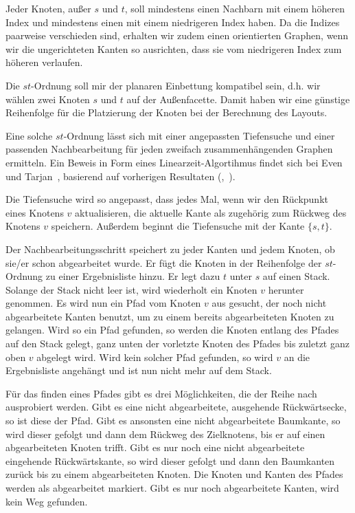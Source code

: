 \documentclass[a4paper]{scrreprt}
\theoremstyle{definition}
\begin{document}
Jeder Knoten, außer $s$ und $t$, soll mindestens einen Nachbarn mit einem höheren Index und mindestens einen mit einem niedrigeren Index haben. Da die Indizes paarweise verschieden sind, erhalten wir zudem einen orientierten Graphen, wenn wir die ungerichteten Kanten so ausrichten, dass sie vom niedrigeren Index zum höheren verlaufen.

Die $st$-Ordnung soll mir der planaren Einbettung kompatibel sein, d.h. wir wählen zwei Knoten $s$ und $t$ auf der Außenfacette. Damit haben wir eine günstige Reihenfolge für die Platzierung der Knoten bei der Berechnung des Layouts. 

Eine solche $st$-Ordnung lässt sich mit einer angepassten Tiefensuche und einer passenden Nachbearbeitung für jeden zweifach zusammenhängenden Graphen ermitteln. Ein Beweis in Form eines Linearzeit-Algortihmus findet sich bei Even und Tarjan~\cite{even+tarjan-75}, basierend auf vorherigen Resultaten (\cite{hopcroft+tarjan-74},~\cite{tarjan-72}).

Die Tiefensuche wird so angepasst, dass jedes Mal, wenn wir den Rückpunkt eines Knotens $v$ aktualisieren, die aktuelle Kante als zugehörig zum Rückweg des Knotens $v$ speichern. Außerdem beginnt die Tiefensuche mit der Kante $\{s, t\}$.

Der Nachbearbeitungsschritt speichert zu jeder Kanten und jedem Knoten, ob sie/er schon abgearbeitet wurde. Er fügt die Knoten in der Reihenfolge der $st$-Ordnung zu einer Ergebnisliste hinzu. Er legt dazu $t$ unter $s$ auf einen Stack. Solange der Stack nicht leer ist, wird wiederholt ein Knoten $v$ herunter genommen. Es wird nun ein Pfad vom Knoten $v$ aus gesucht, der noch nicht abgearbeitete Kanten benutzt, um zu einem bereits abgearbeiteten Knoten zu gelangen. Wird so ein Pfad gefunden, so werden die Knoten entlang des Pfades auf den Stack gelegt, ganz unten der vorletzte Knoten des Pfades bis zuletzt ganz oben $v$ abgelegt wird. Wird kein solcher Pfad gefunden, so wird $v$ an die Ergebnisliste angehängt und ist nun nicht mehr auf dem Stack.

Für das finden eines Pfades gibt es drei Möglichkeiten, die der Reihe nach ausprobiert werden. Gibt es eine nicht abgearbeitete, ausgehende Rückwärtsecke, so ist diese der Pfad. Gibt es ansonsten eine nicht abgearbeitete Baumkante, so wird dieser gefolgt und dann dem Rückweg des Zielknotens, bis er auf einen abgearbeiteten Knoten trifft. Gibt es nur noch eine nicht abgearbeitete eingehende Rückwärtskante, so  wird dieser gefolgt und dann den Baumkanten zurück bis zu einem abgearbeiteten Knoten. Die Knoten und Kanten des Pfades werden als abgearbeitet markiert. Gibt es nur noch abgearbeitete Kanten, wird kein Weg gefunden.
\end{document}
